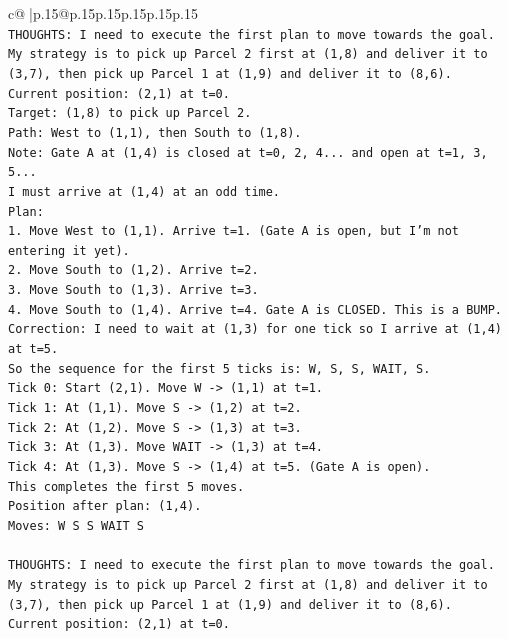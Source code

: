 \documentclass{article}
\begin{document}
{\begin{supertabular}{c@{$\;$}|p{.15\linewidth}@{}p{.15\linewidth}p{.15\linewidth}p{.15\linewidth}p{.15\linewidth}p{.15\linewidth}}
{{{\\ 
\texttt{THOUGHTS: I need to execute the first plan to move towards the goal. My strategy is to pick up Parcel 2 first at (1,8) and deliver it to (3,7), then pick up Parcel 1 at (1,9) and deliver it to (8,6).} \\
\texttt{Current position: (2,1) at t=0.} \\
\texttt{Target: (1,8) to pick up Parcel 2.} \\
\texttt{Path: West to (1,1), then South to (1,8).} \\
\texttt{Note: Gate A at (1,4) is closed at t=0, 2, 4... and open at t=1, 3, 5...} \\
\texttt{I must arrive at (1,4) at an odd time.} \\
\texttt{Plan:} \\
\texttt{1. Move West to (1,1). Arrive t=1. (Gate A is open, but I'm not entering it yet).} \\
\texttt{2. Move South to (1,2). Arrive t=2.} \\
\texttt{3. Move South to (1,3). Arrive t=3.} \\
\texttt{4. Move South to (1,4). Arrive t=4. Gate A is CLOSED. This is a BUMP.} \\
\texttt{Correction: I need to wait at (1,3) for one tick so I arrive at (1,4) at t=5.} \\
\texttt{So the sequence for the first 5 ticks is: W, S, S, WAIT, S.} \\
\texttt{Tick 0: Start (2,1). Move W {-}> (1,1) at t=1.} \\
\texttt{Tick 1: At (1,1). Move S {-}> (1,2) at t=2.} \\
\texttt{Tick 2: At (1,2). Move S {-}> (1,3) at t=3.} \\
\texttt{Tick 3: At (1,3). Move WAIT {-}> (1,3) at t=4.} \\
\texttt{Tick 4: At (1,3). Move S {-}> (1,4) at t=5. (Gate A is open).} \\
\texttt{This completes the first 5 moves.} \\
\texttt{Position after plan: (1,4).} \\
\texttt{Moves: W S S WAIT S} \\
\\ 
\texttt{THOUGHTS: I need to execute the first plan to move towards the goal. My strategy is to pick up Parcel 2 first at (1,8) and deliver it to (3,7), then pick up Parcel 1 at (1,9) and deliver it to (8,6).} \\
\texttt{Current position: (2,1) at t=0.} \\
}}}
\end{supertabular}}
\end{document}
